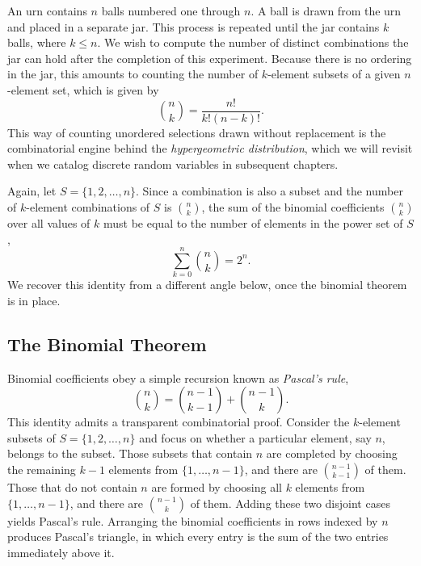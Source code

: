 \begin{example}
An urn contains $n$ balls numbered one through $n$.
A ball is drawn from the urn and placed in a separate jar.
This process is repeated until the jar contains $k$ balls, where $k \leq n$.
We wish to compute the number of distinct combinations the jar can hold after the completion of this experiment.
Because there is no ordering in the jar, this amounts to counting the number of $k$-element subsets of a given $n$-element set, which is given by
\begin{equation*}
\binom{n}{k} = \frac{n!}{k! (n-k)!}.
\end{equation*}
This way of counting unordered selections drawn without replacement is the combinatorial engine behind the \emph{hypergeometric distribution}, which we will revisit when we catalog discrete random variables in subsequent chapters.
\end{example}

Again, let $S = \{1, 2, \ldots, n\}$.
Since a combination is also a subset and the number of $k$-element combinations of $S$ is $\binom{n}{k}$, the sum of the binomial coefficients $\binom{n}{k}$ over all values of $k$ must be equal to the number of elements in the power set of $S$, 
\begin{equation*}
\sum_{k=0}^n \binom{n}{k} = 2^n .
\end{equation*}
We recover this identity from a different angle below, once the binomial theorem is in place.


\subsection{The Binomial Theorem}

Binomial coefficients obey a simple recursion known as \emph{Pascal's rule}, 
\begin{equation*}
\binom{n}{k} = \binom{n-1}{k-1} + \binom{n-1}{k} .
\end{equation*}
This identity admits a transparent combinatorial proof.
Consider the $k$-element subsets of $S = \{ 1, 2, \ldots, n \}$ and focus on whether a particular element, say $n$, belongs to the subset.
Those subsets that contain $n$ are completed by choosing the remaining $k-1$ elements from $\{ 1, \ldots, n-1 \}$, and there are $\binom{n-1}{k-1}$ of them.
Those that do not contain $n$ are formed by choosing all $k$ elements from $\{ 1, \ldots, n-1 \}$, and there are $\binom{n-1}{k}$ of them.
Adding these two disjoint cases yields Pascal's rule.
Arranging the binomial coefficients in rows indexed by $n$ produces Pascal's triangle, in which every entry is the sum of the two entries immediately above it.

